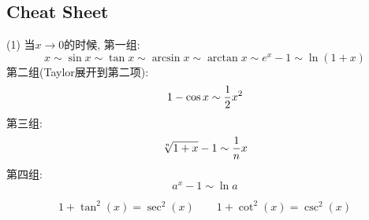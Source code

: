 \subsection{Cheat Sheet}


(1) 当$x\to 0$的时候, 
第一组:
$$
x\sim \sin x \sim \tan x \sim \arcsin x \sim \arctan x\sim e^x-1\sim \ln(1+x)
$$
第二组(Taylor展开到第二项):
$$
1-\cos x \sim {1\over 2} x^2
$$
第三组:
$$
\sqrt[n]{1+x}-1\sim {1\over n } x
$$
第四组: 
$$
a^x-1 \sim \ln a
$$

$$
1+\tan^2(x) = \sec^2(x) \qquad 1+\cot^2(x) = \csc^2(x)
$$
